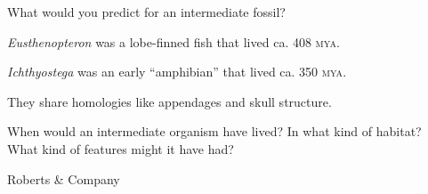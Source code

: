 \documentclass[t]{beamer}
\begin{document}
{
\begin{frame}[t]{What would you predict for an intermediate fossil?}

\begin{multicols}{2}

\phantom{fred}

\columnbreak

\textit{Eusthenopteron} was a lobe-finned fish that lived ca. 408 \textsc{mya}.

\vspace*{\baselineskip}

\textit{Ichthyostega} was an early “amphibian” that lived ca. 350 \textsc{mya}.

\vspace*{\baselineskip}

They share homologies like appendages and skull structure.

\vspace*{\baselineskip}

When would an intermediate organism have lived? In what kind of habitat? What kind of features might it have had?

\end{multicols}

\vfilll

\hfill \tiny \textcopyright Roberts \& Company
\end{frame}
}
%
\end{document}
